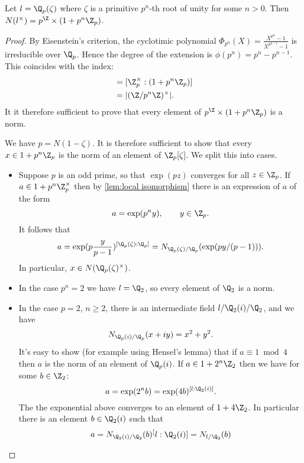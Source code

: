 \begin{lemma} \label{lem:local cyclotomic norms}
	Let $l = \Q_p(\zeta)$ where $\zeta$ is a primitive $p^n$-th root of unity
	for some $n > 0$.
	Then $N(l^\times) = p^\Z \times (1+p^n \Z_p)$.
\end{lemma}

\begin{proof}
	By Eisenstein's criterion, the cyclotimic polynomial
	$\Phi_{p^n}(X) = \frac{X^{p^n}-1}{X^{p^{n-1}}-1}$ is irreducible over $\Q_p$.
	Hence the degree of the extension is $\phi(p^n)=p^n - p^{n-1}$.
	This coincides with the index:
	\begin{align*}
		[\Q_p^\times : p^\Z \times (1+p^n \Z_p)]
		&= [\Z_p^\times : (1+p^n \Z_p)] \\
		&= | (\Z / p^n \Z)^\times |.
	\end{align*}
	It it therefore sufficient to prove that every element of $p^\Z \times (1+p^n \Z_p)$
	is a norm.

	We have $p = N(1-\zeta)$.
	It is therefore sufficient to show that every $x \in 1 + p^n \Z_p$
	is the norm of an element of $\Z_p[\zeta]$. We split this into cases.
	\begin{itemize}
		\item
		Suppose $p$ is an odd prime, so that $\exp(pz)$ converges for all $z\in \Z_p$.
		If $a \in 1 +p^n\Z_p^\times$ then by \ref{lem:local isomorphism}
		there is an expression of $a$ of the form
		\[
			a = \exp(p^n y), \qquad y \in \Z_p.
		\]
		It follows that
		\[
			a= \exp(p\frac{y}{p-1}) ^{[\Q_p(\zeta):\Q_p]}
			= N_{\Q_p(\zeta)/\Q_p}(\exp(py/(p-1))).
		\]
		In particular, $x\in N(\Q_p(\zeta)^\times)$.
		\item
		In the case $p^n = 2$ we have $l = \Q_2$, so every element of $\Q_2$ is a norm.
		\item
		In the case $p=2$, $n \ge 2$, there is an intermediate field $l / \Q_2(i) / \Q_2$,
		and we have
		\[
			N_{\Q_p(i) / \Q_p} (x+i y) = x^2 + y^2.
		\]
		It's easy to show (for example using Hensel's lemma) that if $a \equiv 1 \bmod 4$
		then $a$ is the norm of an element of $\Q_p(i)$.
		If $a \in 1 + 2^n \Z_2$ then we have for some $b \in \Z_2$:
		\[
			a = \exp(2^n b) = \exp(4b)^{[l:\Q_2(i)]}.
		\]
		The the exponential above converges to an element of $1+4\Z_2$.
		In particular there is an element $b \in \Q_2(i)$ such that
		\[
			a = N_{\Q_2(i)/\Q_2} (b) ^ [l:\Q_2(i)]
			= N_{l/\Q_2} (b)
		\]
	\end{itemize}
\end{proof}

